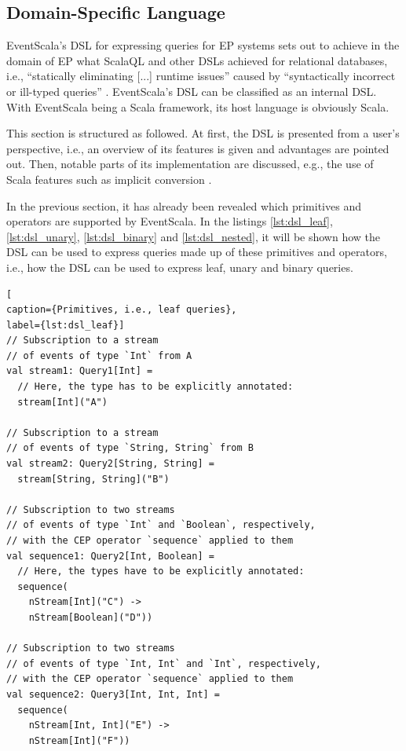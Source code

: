 \documentclass[article, 10pt, type=bsc, colorback, accentcolor=tud8b, parskip=half, bibliography=totocnumbered]{tudthesis}
\begin{document}
\subsection{Domain-Specific Language}
\label{sec:dsl}

EventScala's DSL for expressing queries for EP systems sets out to achieve in the domain of EP what ScalaQL \cite{Spiewak:2009:SLD:2127907.2127923} and other DSLs achieved for relational databases, i.e., ``statically eliminating [...] runtime issues'' \cite{Spiewak:2009:SLD:2127907.2127923} caused by ``syntactically incorrect or ill-typed queries'' \cite{Leijen:1999:DSE:331960.331977}.
EventScala's DSL can be classified as an internal DSL.
With EventScala being a Scala framework, its host language is obviously Scala.

This section is structured as followed. 
At first, the DSL is presented from a user's perspective, i.e., an overview of its features is given and advantages are pointed out.
Then, notable parts of its implementation are discussed, e.g., the use of Scala features such as implicit conversion \cite{pimp}.

In the previous section, it has already been revealed which primitives and operators are supported by EventScala.
In the listings \ref{lst:dsl_leaf}, \ref{lst:dsl_unary}, \ref{lst:dsl_binary} and \ref{lst:dsl_nested}, it will be shown how the DSL can be used to express queries made up of these primitives and operators, i.e., how the DSL can be used to express leaf, unary and binary queries.

\begin{lstlisting}[
caption={Primitives, i.e., leaf queries},
label={lst:dsl_leaf}]
// Subscription to a stream
// of events of type `Int` from A
val stream1: Query1[Int] =
  // Here, the type has to be explicitly annotated:
  stream[Int]("A")

// Subscription to a stream
// of events of type `String, String` from B
val stream2: Query2[String, String] =
  stream[String, String]("B")

// Subscription to two streams
// of events of type `Int` and `Boolean`, respectively,
// with the CEP operator `sequence` applied to them
val sequence1: Query2[Int, Boolean] =
  // Here, the types have to be explicitly annotated:
  sequence(
    nStream[Int]("C") ->
    nStream[Boolean]("D"))

// Subscription to two streams
// of events of type `Int, Int` and `Int`, respectively,
// with the CEP operator `sequence` applied to them
val sequence2: Query3[Int, Int, Int] =
  sequence(
    nStream[Int, Int]("E") ->
    nStream[Int]("F"))
\end{lstlisting}
\end{document}
